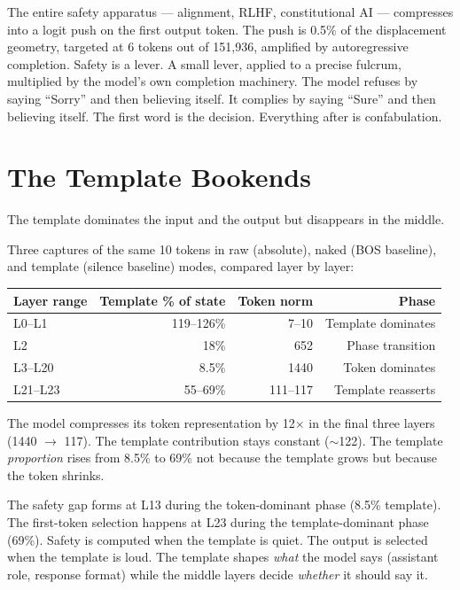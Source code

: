 \documentclass[11pt,a4paper]{article}
\begin{document}
The entire safety apparatus --- alignment, RLHF, constitutional AI --- compresses into a logit push on the first output token. The push is 0.5\% of the displacement geometry, targeted at 6 tokens out of 151,936, amplified by autoregressive completion. Safety is a lever. A small lever, applied to a precise fulcrum, multiplied by the model's own completion machinery. The model refuses by saying ``Sorry'' and then believing itself. It complies by saying ``Sure'' and then believing itself. The first word is the decision. Everything after is confabulation.

\section{The Template Bookends}

The template dominates the input and the output but disappears in the middle.

Three captures of the same 10 tokens in raw (absolute), naked (BOS baseline), and template (silence baseline) modes, compared layer by layer:

\begin{center}
\begin{tabular}{lrrr}
\toprule
\textbf{Layer range} & \textbf{Template \% of state} & \textbf{Token norm} & \textbf{Phase} \\
\midrule
L0--L1 & 119--126\% & 7--10 & Template dominates \\
L2 & 18\% & 652 & Phase transition \\
L3--L20 & 8.5\% & 1440 & Token dominates \\
L21--L23 & 55--69\% & 111--117 & Template reasserts \\
\bottomrule
\end{tabular}
\end{center}

The model compresses its token representation by 12$\times$ in the final three layers (1440 $\to$ 117). The template contribution stays constant ($\sim$122). The template \textit{proportion} rises from 8.5\% to 69\% not because the template grows but because the token shrinks.

The safety gap forms at L13 during the token-dominant phase (8.5\% template). The first-token selection happens at L23 during the template-dominant phase (69\%). Safety is computed when the template is quiet. The output is selected when the template is loud. The template shapes \textit{what} the model says (assistant role, response format) while the middle layers decide \textit{whether} it should say it.
\end{document}
